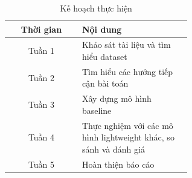 \begin{table}[htbp]
\caption{Kế hoạch thực hiện}
\begin{center}
\begin{tabular}{|c|p{0.6\linewidth}|}
\hline
\textbf{Thời gian} & \textbf{Nội dung} \\
\hline
Tuần 1 & Khảo sát tài liệu và tìm hiểu dataset \\
\hline
Tuần 2 & Tìm hiểu các hướng tiếp cận bài toán \\
\hline
Tuần 3 & Xây dựng mô hình baseline \\
\hline
Tuần 4 & Thực nghiệm với các mô hình lightweight khác, so sánh và đánh giá \\
\hline
Tuần 5 & Hoàn thiện báo cáo \\
\hline
\end{tabular}
\label{tab:schedule}
\end{center}
\end{table}
